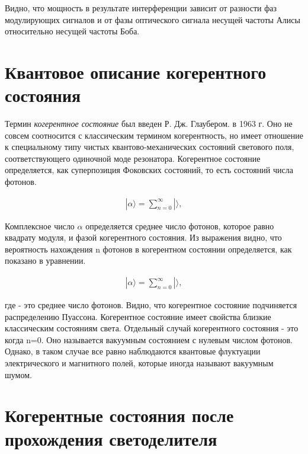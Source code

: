 Видно, что мощность в результате интерференции зависит от разности фаз модулирующих сигналов и от фазы оптического сигнала несущей частоты Алисы относительно несущей частоты Боба.

\section{Квантовое описание когерентного состояния} \label{sec:ch4/sec3}
Термин \textit{когерентное состояние} был введен Р. Дж. Глаубером. в 1963 г. Оно не совсем соотносится с классическим термином когерентность, но имеет отношение к специальному типу чистых квантово-механических состояний светового поля, соответствующего одиночной моде резонатора. Когерентное состояние определяется, как суперпозиция Фоковских состояний, то есть состояний числа фотонов. 


\begin{equation}
	\begin{aligned}
		|\alpha \rangle = \sum_{n=0}^\infty   |  \rangle,
	\end{aligned}
\end{equation}

Комплексное число $ \alpha $	определяется среднее число фотонов, которое равно квадрату модуля, и фазой когерентного состояния. Из выражения видно, что вероятность нахождения n фотонов в когерентном состоянии определяется, как показано в уравнении. 

\begin{equation}
	\begin{aligned}
		|\alpha \rangle = \sum_{n=0}^\infty   |  \rangle,
	\end{aligned}
\end{equation}

где - это среднее число фотонов. Видно, что когерентное состояние подчиняется распределению Пуассона. Когерентное состояние имеет свойства близкие классическим состояниям света. Отдельный случай когерентного состояния - это когда n=0. Оно называется вакуумным состоянием с нулевым числом фотонов. Однако, в таком случае все равно наблюдаются квантовые флуктуации электрического и магнитного полей, которые иногда называют вакуумным шумом. 



\section{Когерентные состояния после прохождения светоделителя} \label{ch:ch4/sec4}
 
